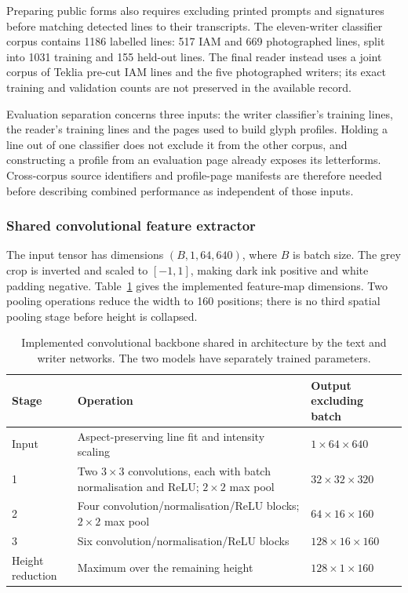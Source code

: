 Preparing public forms also requires excluding printed prompts and signatures before matching detected lines to their transcripts. The eleven-writer classifier corpus contains 1186 labelled lines: 517 IAM and 669 photographed lines, split into 1031 training and 155 held-out lines. The final reader instead uses a joint corpus of Teklia pre-cut IAM lines and the five photographed writers; its exact training and validation counts are not preserved in the available record.

Evaluation separation concerns three inputs: the writer classifier's training lines, the reader's training lines and the pages used to build glyph profiles. Holding a line out of one classifier does not exclude it from the other corpus, and constructing a profile from an evaluation page already exposes its letterforms. Cross-corpus source identifiers and profile-page manifests are therefore needed before describing combined performance as independent of those inputs.

\subsubsection{Shared convolutional feature extractor}
The input tensor has dimensions $(B,1,64,640)$, where $B$ is batch size. The grey crop is inverted and scaled to $[-1,1]$, making dark ink positive and white padding negative. Table~\ref{tab:des-backbone} gives the implemented feature-map dimensions. Two pooling operations reduce the width to 160 positions; there is no third spatial pooling stage before height is collapsed.

\begin{table}[!htbp]\centering\small
\begin{tabularx}{\linewidth}{|l|X|l|}
\hline\textbf{Stage}&\textbf{Operation}&\textbf{Output excluding batch}\\\hline
Input&Aspect-preserving line fit and intensity scaling&$1\times64\times640$\\\hline
1&Two $3\times3$ convolutions, each with batch normalisation and ReLU; $2\times2$ max pool&$32\times32\times320$\\\hline
2&Four convolution/normalisation/ReLU blocks; $2\times2$ max pool&$64\times16\times160$\\\hline
3&Six convolution/normalisation/ReLU blocks&$128\times16\times160$\\\hline
Height reduction&Maximum over the remaining height&$128\times1\times160$\\\hline
\end{tabularx}
\caption{Implemented convolutional backbone shared in architecture by the text and writer networks. The two models have separately trained parameters.}
\label{tab:des-backbone}
\end{table}

